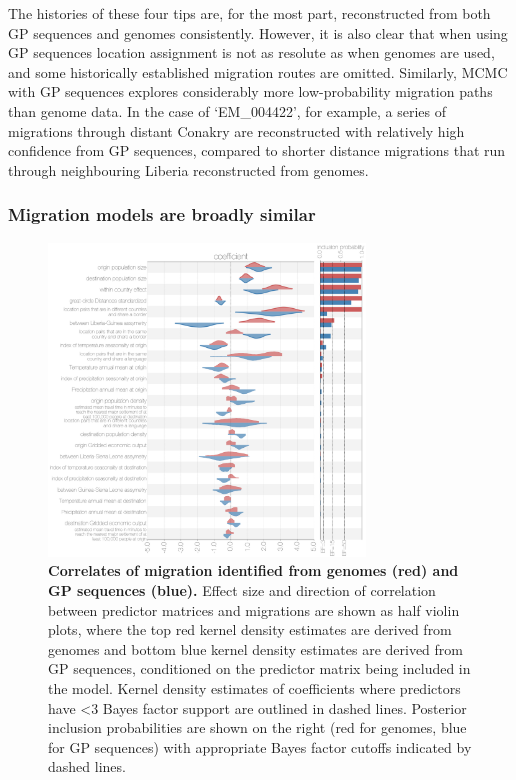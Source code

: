 \documentclass[11pt,oneside,letterpaper]{article}
\begin{document}
The histories of these four tips are, for the most part, reconstructed from both GP sequences and genomes consistently.
However, it is also clear that when using GP sequences location assignment is not as resolute as when genomes are used, and some historically established migration routes are omitted.
Similarly, MCMC with GP sequences explores considerably more low-probability migration paths than genome data.
In the case of `EM\_004422', for example, a series of migrations through distant Conakry are reconstructed with relatively high confidence from GP sequences, compared to shorter distance migrations that run through neighbouring Liberia reconstructed from genomes.

\subsubsection*{Migration models are broadly similar}

\begin{figure}[ht]
 \centering
	\includegraphics[width=0.75\textwidth]{figures/fig4_glm.png}
	\caption{\textbf{Correlates of migration identified from genomes (red) and GP sequences (blue).}
  Effect size and direction of correlation between predictor matrices and migrations are shown as half violin plots, where the top red kernel density estimates are derived from genomes and bottom blue kernel density estimates are derived from GP sequences, conditioned on the predictor matrix being included in the model.
  Kernel density estimates of coefficients where predictors have <3 Bayes factor support are outlined in dashed lines.
  Posterior inclusion probabilities are shown on the right (red for genomes, blue for GP sequences) with appropriate Bayes factor cutoffs indicated by dashed lines.
	}
	\label{glm}
\end{figure}
\end{document}
